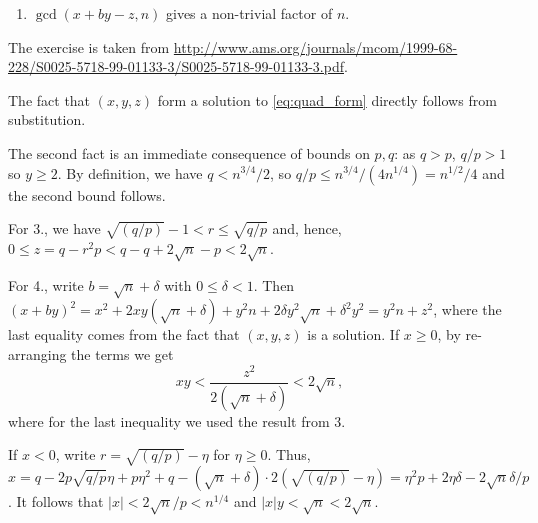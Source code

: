 \documentclass[11pt]{exam}
\theoremstyle{definition}
\begin{document}
{\begin{questions}
\begin{enumerate}
		\item $\gcd(x+by-z, n)$ gives a non-trivial factor of $n$.
	\end{enumerate}
	\begin{solution}
		The exercise is taken from \url{http://www.ams.org/journals/mcom/1999-68-228/S0025-5718-99-01133-3/S0025-5718-99-01133-3.pdf}.
		
		The fact that $(x,y,z)$ form a solution to \eqref{eq:quad_form} directly follows from substitution.
		
		The second fact is an immediate consequence of bounds on $p,q$: as $q>p$, $q/p>1$ so $y\geq 2$. By definition, we have $q<n^{3/4}/2$, so $q/p \leq n^{3/4}/(4n^{1/4})=n^{1/2}/4$ and the second bound follows. 
		
		For 3., we have $\sqrt{(q/p)}-1 < r \leq \sqrt{q/p}$ and, hence, $0 \leq z  = q-r^2p < q-q+2\sqrt{n}-p < 2 \sqrt{n}$.
		
		For 4., write $b =\sqrt{n}+\delta$ with $0 \leq \delta <1$. Then $(x+by)^2 = x^2+2xy(\sqrt{n}+\delta)+y^2n+2\delta y^2 \sqrt{n} + \delta^2 y^2 = y^2n+z^2$, where the last equality comes from the fact that $(x, y,z)$ is a solution. If $x \geq 0$, by re-arranging the terms we get
		\[
			xy < \frac{z^2}{2(\sqrt{n}+\delta)} < 2 \sqrt{n},
		\]
		where for the last inequality we used the result from 3.
		
		If $x<0$, write $r  = \sqrt{(q/p)} - \eta$ for $\eta \geq 0$. Thus, $x = q - 2p\sqrt{q/p}\eta + p \eta^2 + q - (\sqrt{n}+\delta) \cdot 2( \sqrt{(q/p)} - \eta) = \eta^2p+2\eta \delta - 2 \sqrt{n} \delta / p$. It follows that $|x| < 2 \sqrt{n}/p < n^{1/4}$ and $|x|y < \sqrt{n}<2\sqrt{n}$.
		

\end{solution}
\end{questions}}
\end{document}
